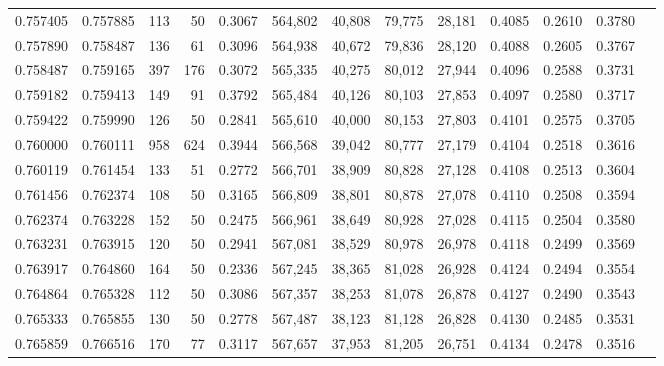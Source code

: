\begin{tabular}{rrrrrrrrrrrrr}
0.757405 & 0.757885 &   113 &  50 &                                     0.3067 & 564,802 &  40,808 &  79,775 &  28,181 & 0.4085 & 0.2610 & 0.3780 \\
0.757890 & 0.758487 &   136 &  61 &                                     0.3096 & 564,938 &  40,672 &  79,836 &  28,120 & 0.4088 & 0.2605 & 0.3767 \\
0.758487 & 0.759165 &   397 & 176 &                                     0.3072 & 565,335 &  40,275 &  80,012 &  27,944 & 0.4096 & 0.2588 & 0.3731 \\
0.759182 & 0.759413 &   149 &  91 &                                     0.3792 & 565,484 &  40,126 &  80,103 &  27,853 & 0.4097 & 0.2580 & 0.3717 \\
0.759422 & 0.759990 &   126 &  50 &                                     0.2841 & 565,610 &  40,000 &  80,153 &  27,803 & 0.4101 & 0.2575 & 0.3705 \\
0.760000 & 0.760111 &   958 & 624 &                                     0.3944 & 566,568 &  39,042 &  80,777 &  27,179 & 0.4104 & 0.2518 & 0.3616 \\
0.760119 & 0.761454 &   133 &  51 &                                     0.2772 & 566,701 &  38,909 &  80,828 &  27,128 & 0.4108 & 0.2513 & 0.3604 \\
0.761456 & 0.762374 &   108 &  50 &                                     0.3165 & 566,809 &  38,801 &  80,878 &  27,078 & 0.4110 & 0.2508 & 0.3594 \\
0.762374 & 0.763228 &   152 &  50 &                                     0.2475 & 566,961 &  38,649 &  80,928 &  27,028 & 0.4115 & 0.2504 & 0.3580 \\
0.763231 & 0.763915 &   120 &  50 &                                     0.2941 & 567,081 &  38,529 &  80,978 &  26,978 & 0.4118 & 0.2499 & 0.3569 \\
0.763917 & 0.764860 &   164 &  50 &                                     0.2336 & 567,245 &  38,365 &  81,028 &  26,928 & 0.4124 & 0.2494 & 0.3554 \\
0.764864 & 0.765328 &   112 &  50 &                                     0.3086 & 567,357 &  38,253 &  81,078 &  26,878 & 0.4127 & 0.2490 & 0.3543 \\
0.765333 & 0.765855 &   130 &  50 &                                     0.2778 & 567,487 &  38,123 &  81,128 &  26,828 & 0.4130 & 0.2485 & 0.3531 \\
0.765859 & 0.766516 &   170 &  77 &                                     0.3117 & 567,657 &  37,953 &  81,205 &  26,751 & 0.4134 & 0.2478 & 0.3516 \\

\end{tabular}
